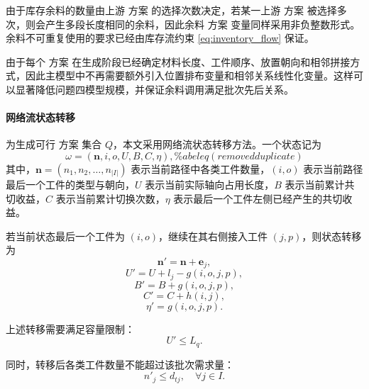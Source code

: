 \documentclass[UTF8]{ctexart}
\begin{document}
由于库存余料的数量由上游 方案 的选择次数决定，若某一上游 方案 被选择多次，则会产生多段长度相同的余料，因此余料 方案 变量同样采用非负整数形式。余料不可重复使用的要求已经由库存流约束 \eqref{eq:inventory_flow} 保证。

由于每个 方案 在生成阶段已经确定材料长度、工件顺序、放置朝向和相邻拼接方式，因此主模型中不再需要额外引入位置排布变量和相邻关系线性化变量。这样可以显著降低问题四模型规模，并保证余料调用满足批次先后关系。

\paragraph{网络流状态转移}

为生成可行 方案 集合 $Q$，本文采用网络流状态转移方法。一个状态记为
\begin{equation}
\omega=
\left(
\boldsymbol{n},i,o,U,B,C,\eta
\right),
\% abel{eq} (removed duplicate)
\end{equation}
其中，$\boldsymbol{n}=(n_1,n_2,\ldots,n_{|I|})$ 表示当前路径中各类工件数量，$(i,o)$ 表示当前路径最后一个工件的类型与朝向，$U$ 表示当前实际轴向占用长度，$B$ 表示当前累计共切收益，$C$ 表示当前累计切换次数，$\eta$ 表示最后一个工件左侧已经产生的共切收益。

若当前状态最后一个工件为 $(i,o)$，继续在其右侧接入工件 $(j,p)$，则状态转移为
\begin{equation}
\boldsymbol{n}'=\boldsymbol{n}+\boldsymbol{e}_j,
\label{eq:p4_nprime}
\end{equation}
\begin{equation}
U'=U+l_j-g(i,o,j,p),
\label{eq:p4_Uprime}
\end{equation}
\begin{equation}
B'=B+g(i,o,j,p),
\label{eq:p4_Bprime}
\end{equation}
\begin{equation}
C'=C+h(i,j),
\label{eq:p4_Cprime}
\end{equation}
\begin{equation}
\eta'=g(i,o,j,p).
\label{eq:p4_eta}
\end{equation}

上述转移需要满足容量限制：
\begin{equation}
U'\leq L_q.
\label{eq:p4_UleLq}
\end{equation}

同时，转移后各类工件数量不能超过该批次需求量：
\begin{equation}
n'_j\leq d_{tj},
\quad \forall j\in I.
\label{eq:p4_countlimit}
\end{equation}
\end{document}
